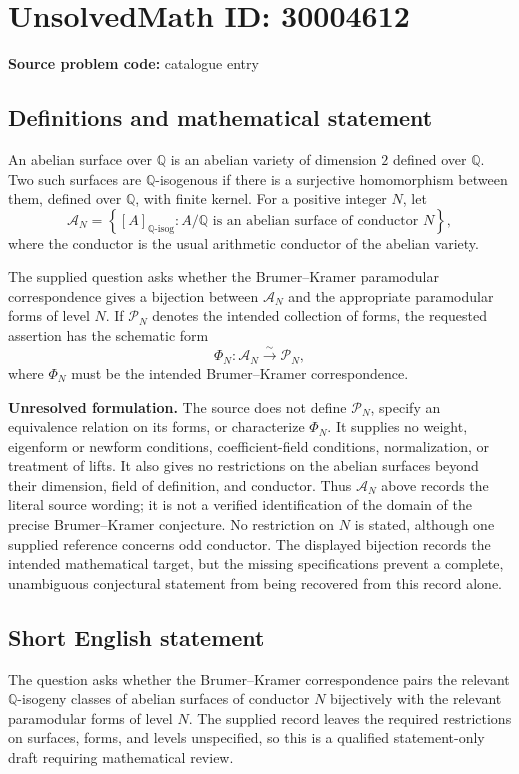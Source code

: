 \documentclass[11pt]{article}
\newcommand{\Q}{\mathbb{Q}}
\begin{document}
\section*{UnsolvedMath ID: 30004612}
\textbf{Source problem code:} catalogue entry
\subsection{Definitions and mathematical statement}
An abelian surface over \(\Q\) is an abelian variety of dimension \(2\) defined over \(\Q\). Two such surfaces are \(\Q\)-isogenous if there is a surjective homomorphism between them, defined over \(\Q\), with finite kernel. For a positive integer \(N\), let
\[
\mathcal A_N=\left\{[A]_{\Q\text{-isog}}: A/\Q\text{ is an abelian surface of conductor }N\right\},
\]
where the conductor is the usual arithmetic conductor of the abelian variety.

The supplied question asks whether the Brumer--Kramer paramodular correspondence gives a bijection between \(\mathcal A_N\) and the appropriate paramodular forms of level \(N\). If \(\mathcal P_N\) denotes the intended collection of forms, the requested assertion has the schematic form
\[
\Phi_N:\mathcal A_N\xrightarrow{\;\sim\;}\mathcal P_N,
\]
where \(\Phi_N\) must be the intended Brumer--Kramer correspondence.

\textbf{Unresolved formulation.} The source does not define \(\mathcal P_N\), specify an equivalence relation on its forms, or characterize \(\Phi_N\). It supplies no weight, eigenform or newform conditions, coefficient-field conditions, normalization, or treatment of lifts. It also gives no restrictions on the abelian surfaces beyond their dimension, field of definition, and conductor. Thus \(\mathcal A_N\) above records the literal source wording; it is not a verified identification of the domain of the precise Brumer--Kramer conjecture. No restriction on \(N\) is stated, although one supplied reference concerns odd conductor. The displayed bijection records the intended mathematical target, but the missing specifications prevent a complete, unambiguous conjectural statement from being recovered from this record alone.
\subsection{Short English statement}
The question asks whether the Brumer--Kramer correspondence pairs the relevant \(\Q\)-isogeny classes of abelian surfaces of conductor \(N\) bijectively with the relevant paramodular forms of level \(N\). The supplied record leaves the required restrictions on surfaces, forms, and levels unspecified, so this is a qualified statement-only draft requiring mathematical review.
\end{document}
